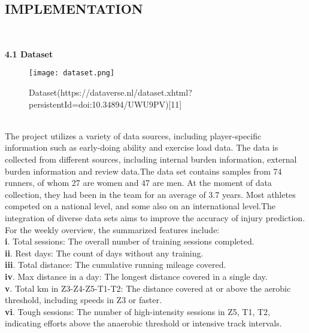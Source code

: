 \documentclass[12pt, English]{article}
\newcommand\tab[1][1cm]{\hspace*{#1}}
\begin{document}
\begin{normalsize}
\begin{center}
\section{ \Large IMPLEMENTATION}
\end{center}
\\
\begin{large}
\textbf{4.1 Dataset}\\
\end{large}
\begin{figure}[htb]
\begin{center}
\texttt{[image: dataset.png]}
\end{center}
\begin{center}
\renewcommand{\thefigure}{4.1.1}
\caption{\footnotesize Dataset(https://dataverse.nl/dataset.xhtml?persistentId=doi:10.34894/UWU9PV)[11]}
\end{center}
\end{figure}\\
\text
\tab
 The project utilizes a variety of data sources, including player-specific information such as early-doing ability and exercise load data. The data is collected from different sources, including internal burden information, external burden information and review data.The data set contains samples from 74 runners, of whom 27 are women and 47 are men. At the moment of data collection, they had been in the team for an average of 3.7 years. Most athletes competed on a national level, and some also on an international level.The integration of diverse data sets aims to improve the accuracy of injury prediction.
\\
\newpage
\text
For the weekly overview, the summarized features include:\\
\textbf{i}.	Total sessions: The overall number of training sessions completed.\\
\textbf{ii}. Rest days: The count of days without any training.\\
\textbf{iii}. Total distance: The cumulative running mileage covered.\\
\textbf{iv}. Max distance in a day: The longest distance covered in a single day.\\
\textbf{v}.	Total km in Z3-Z4-Z5-T1-T2: The distance covered at or above the aerobic threshold, including speeds in Z3 or faster.\\
\textbf{vi}. Tough sessions: The number of high-intensity sessions in Z5, T1, T2, indicating efforts above the anaerobic threshold or intensive track intervals.\\

\end{normalsize}
\end{document}
